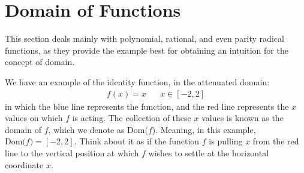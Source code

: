 \section{Domain of Functions}

This section deals mainly with polynomial, rational, and even parity radical functions, as they provide the example best for obtaining an intuition for the concept of domain.

\begin{example}
We have an example of the identity function, in the attenuated domain:
\begin{align*}
    f(x) = x \hspace{20pt} x \in [-2, 2]
\end{align*}
in which the blue line represents the function, and the red line represents the $x$ values on which $f$ is acting. The collection of these $x$ values is known as the domain of $f$, which we denote as Dom($f$). Meaning, in this example, $\text{Dom($f$)} = [-2, 2]$. Think about it as if the function $f$ is pulling $x$ from the red line to the vertical position at which $f$ wishes to settle at the horizontal coordinate $x$. 

\vspace{0.5in}
\end{example}

